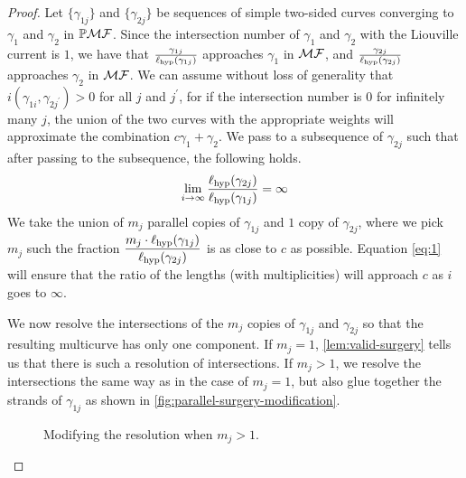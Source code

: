 \documentclass[12pt, reqno]{amsart}
\begin{document}
\begin{proof}
  Let $\{\gamma_{1j}\}$ and $\{ \gamma_{2j}\}$ be sequences of simple two-sided curves converging to $\gamma_1$ and $\gamma_2$ in $\mathbb{P}\mathcal{MF}$.
  Since the intersection number of $\gamma_1$ and $\gamma_2$ with the Liouville current is $1$, we have that $\frac{\gamma_{1j}}{\ell_{\mathrm{hyp}}(\gamma_{1j})}$ approaches $\gamma_1$ in $\mathcal{MF}$, and $\frac{\gamma_{2j}}{\ell_{\mathrm{hyp}}(\gamma_{2j})}$ approaches $\gamma_2$ in $\mathcal{MF}$.
  We can assume without loss of generality that $i(\gamma_{1i}, \gamma_{2j^{\prime}}) > 0$ for all $j$ and $j^{\prime}$, for if the intersection number is $0$ for infinitely many $j$, the union of the two curves with the appropriate weights will approximate the combination $c \gamma_1 + \gamma_2$.
  We pass to a subsequence of $\gamma_{2j}$ such that after passing to the subsequence,
  the following holds.
  \begin{align}
    \label{eq:1}
    \lim_{i \to \infty} \frac{\ell_{\mathrm{hyp}}(\gamma_{2j})}{\ell_{\mathrm{hyp}}(\gamma_{1j})} = \infty
  \end{align}
  We take the union of $m_j$ parallel copies of $\gamma_{1j}$ and $1$ copy of $\gamma_{2j}$, where we pick $m_j$ such the fraction $\displaystyle \frac{m_j \cdot \ell_{\mathrm{hyp}}(\gamma_{1j})}{\ell_{\mathrm{hyp}}(\gamma_{2j})}$ is as close to $c$ as possible.
  Equation \eqref{eq:1} will ensure that the ratio of the lengths (with multiplicities) will approach $c$ as $i$ goes to $\infty$.

  We now resolve the intersections of the $m_j$ copies of $\gamma_{1j}$ and $\gamma_{2j}$ so that the resulting multicurve has only one component.
  If $m_j = 1$, \autoref{lem:valid-surgery} tells us that there is such a resolution of intersections.
  If $m_j > 1$, we resolve the intersections the same way as in the case of $m_j = 1$, but also glue together the strands of $\gamma_{1j}$ as shown in \autoref{fig:parallel-surgery-modification}.
  \begin{figure}[h]
    \centering
    \caption{Modifying the resolution when $m_j > 1$.}
    \label{fig:parallel-surgery-modification}
  \end{figure}


\end{proof}
\end{document}
